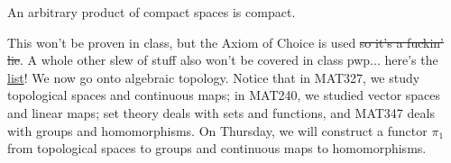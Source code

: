 \begin{simplethm}
    An arbitrary product of compact spaces is compact.
\end{simplethm}
\noindent This won't be proven in class, but the Axiom of Choice is used \sout{so it's a fuckin' lie}. A whole other slew of stuff also won't be covered in class pwp... here's the \href{https://drorbn.net/AcademicPensieve/Classes/24-327-Topology/WhatWeMiss.png}{list}!
\medskip\newline
\noindent We now go onto algebraic topology. Notice that in MAT327, we study topological spaces and continuous maps; in MAT240, we studied vector spaces and linear maps; set theory deals with sets and functions, and MAT347 deals with groups and homomorphisms. On Thursday, we will construct a functor $\pi_1$ from topological spaces to groups and continuous maps to homomorphisms.